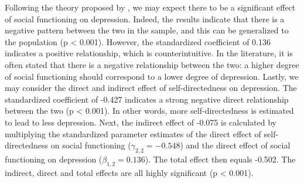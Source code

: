 \documentclass[11pt]{article}
\begin{document}
Following the theory proposed by \textcite{tse2011}, we may expect there to be
a significant effect of social functioning on depression. Indeed, the results
indicate that there is a negative pattern between the two in the sample, and
this can be generalized to the population (p < 0.001). However, the standardized
coefficient of 0.136 indicates a positive relationship, which is
counterintuitive. In the literature, it is often stated that there is a negative
relationship between the two: a higher degree of social functioning should
correspond to a lower degree of depression. Lastly, we may consider the direct
and indirect effect of self-directedness on depression. The standardized
coefficient of -0.427 indicates a strong negative direct relationship between
the two (p < 0.001). In other words, more self-directedness is estimated to lead
to less depression. Next, the indirect effect of -0.075 is calculated by
multiplying the standardized parameter estimates of the direct effect of
self-directedness on social functioning ($\gamma_{2,2} = -0.548$) and the direct
effect of social functioning on depression ($\beta_{1,2} = 0.136$). The total
effect then equals -0.502. The indirect, direct and total effects are all highly
significant (p < 0.001).
\end{document}
